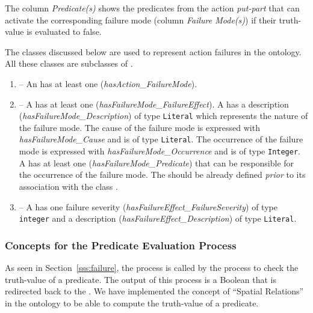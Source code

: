 The column \textit{Predicate(s)} shows the predicates from the action \textit{put-part} that can activate the corresponding failure mode (column \textit{Failure Mode(s)}) if their truth-value is evaluated to false.

The classes discussed below are used to represent action failures in the  ontology. All these classes are subclasses of .
\begin{enumerate}
\item {} -- An  has at least one  (\emph{hasAction\_FailureMode}).
\item {} -- A  has at least one  (\emph{hasFailureMode\_FailureEffect}). A  has a description (\emph{hasFailureMode\_Description}) of type \texttt{Literal} which represents the nature of the failure mode. The cause of the failure mode is expressed with \emph{hasFailureMode\_Cause} and is of type \texttt{Literal}. The occurrence of the failure mode is expressed with \emph{hasFailureMode\_Occurrence} and is of type \texttt{Integer}. A  has at least one  (\emph{hasFailureMode\_Predicate}) that can be responsible for the occurrence of the failure mode. The  should be already defined \textit{prior} to its association with the class .
\item {} -- A  has one failure severity (\emph{hasFailureEffect\_FailureSeverity}) of type \texttt{integer} and a description (\emph{hasFailureEffect\_Description}) of type \texttt{Literal}.
\end{enumerate}

\subsubsection{Concepts for the Predicate Evaluation Process}
As seen in Section~\ref{sss:failure}, the  process is called by the  process to check the truth-value of a predicate. The output of this process is a Boolean that is redirected back to the . We have implemented the concept of ``Spatial Relations'' in the  ontology to be able to compute the truth-value of a predicate.

